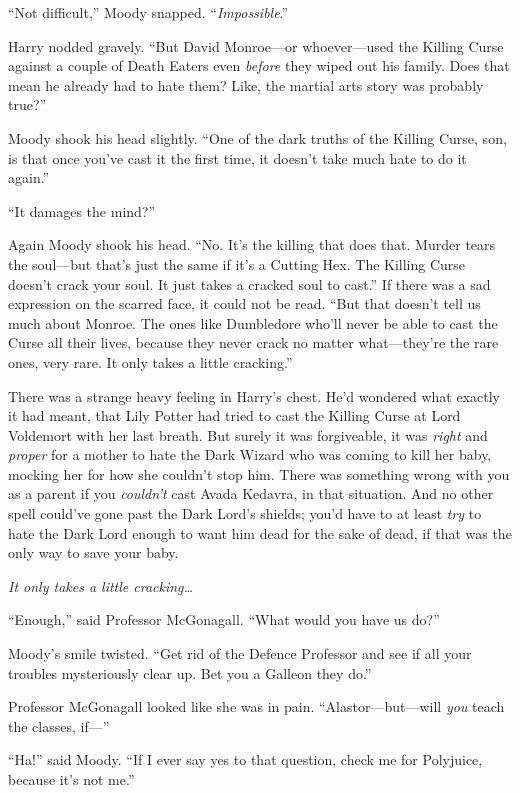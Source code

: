 “Not difficult,” Moody snapped. “\emph{Impossible}.”

Harry nodded gravely. “But David Monroe—or whoever—used the Killing Curse against a couple of Death Eaters even \emph{before} they wiped out his family. Does that mean he already had to hate them? Like, the martial arts story was probably true?”

Moody shook his head slightly. “One of the dark truths of the Killing Curse, son, is that once you’ve cast it the first time, it doesn’t take much hate to do it again.”

“It damages the mind?”

Again Moody shook his head. “No. It’s the killing that does that. Murder tears the soul—but that’s just the same if it’s a Cutting Hex. The Killing Curse doesn’t crack your soul. It just takes a cracked soul to cast.” If there was a sad expression on the scarred face, it could not be read. “But that doesn’t tell us much about Monroe. The ones like Dumbledore who’ll never be able to cast the Curse all their lives, because they never crack no matter what—they’re the rare ones, very rare. It only takes a little cracking.”

There was a strange heavy feeling in Harry’s chest. He’d wondered what exactly it had meant, that Lily Potter had tried to cast the Killing Curse at Lord Voldemort with her last breath. But surely it was forgiveable, it was \emph{right} and \emph{proper} for a mother to hate the Dark Wizard who was coming to kill her baby, mocking her for how she couldn’t stop him. There was something wrong with you as a parent if you \emph{couldn’t} cast Avada Kedavra, in that situation. And no other spell could’ve gone past the Dark Lord’s shields; you’d have to at least \emph{try} to hate the Dark Lord enough to want him dead for the sake of dead, if that was the only way to save your baby.

\emph{It only takes a little cracking…}

“Enough,” said Professor McGonagall. “What would you have us do?”

Moody’s smile twisted. “Get rid of the Defence Professor and see if all your troubles mysteriously clear up. Bet you a Galleon they do.”

Professor McGonagall looked like she was in pain. “Alastor—but—will \emph{you} teach the classes, if—”

“Ha!” said Moody. “If I ever say yes to that question, check me for Polyjuice, because it’s not me.”

